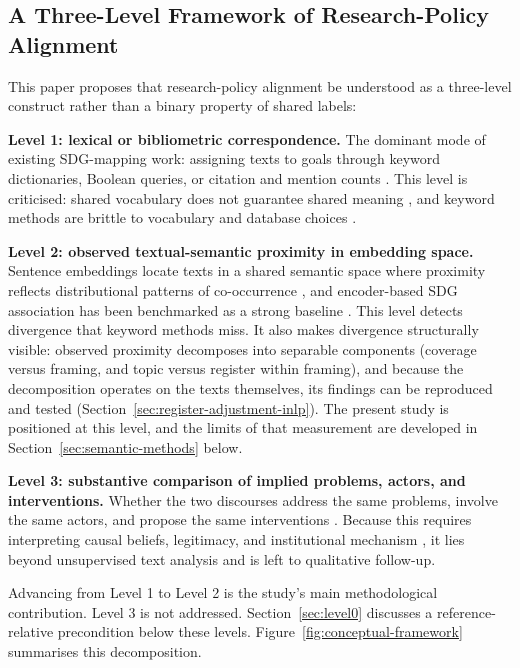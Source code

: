 \documentclass[12pt,a4paper]{article}
\begin{document}
\subsection{A Three-Level Framework of Research-Policy Alignment}\label{sec:alignment-framework}

This paper proposes that research-policy alignment be understood as a three-level construct rather than a binary property of shared labels:

\textbf{Level 1: lexical or bibliometric correspondence.} The dominant mode of existing SDG-mapping work: assigning texts to goals through keyword dictionaries, Boolean queries, or citation and mention counts \parencite{Armitage2020, Kashnitsky2024}. This level is criticised: shared vocabulary does not guarantee shared meaning \parencite{bornmann2016policy}, and keyword methods are brittle to vocabulary and database choices \parencite{Armitage2020}.

\textbf{Level 2: observed textual-semantic proximity in embedding space.} Sentence embeddings locate texts in a shared semantic space where proximity reflects distributional patterns of co-occurrence \parencite{Harris1954, Reimers2019}, and encoder-based SDG association has been benchmarked as a strong baseline \parencite{Gjorgjevikj2025}. This level detects divergence that keyword methods miss. It also makes divergence structurally visible: observed proximity decomposes into separable components (coverage versus framing, and topic versus register within framing), and because the decomposition operates on the texts themselves, its findings can be reproduced and tested (Section~\ref{sec:register-adjustment-inlp}). The present study is positioned at this level, and the limits of that measurement are developed in Section~\ref{sec:semantic-methods} below.

\textbf{Level 3: substantive comparison of implied problems, actors, and interventions.} Whether the two discourses address the same problems, involve the same actors, and propose the same interventions \parencite{Cash2003, Guston2001, Haas1992}. Because this requires interpreting causal beliefs, legitimacy, and institutional mechanism \parencite{Caplan1979, Haas1992}, it lies beyond unsupervised text analysis and is left to qualitative follow-up.

Advancing from Level 1 to Level 2 is the study's main methodological contribution. Level 3 is not addressed. Section~\ref{sec:level0} discusses a reference-relative precondition below these levels. Figure~\ref{fig:conceptual-framework} summarises this decomposition.
\end{document}
